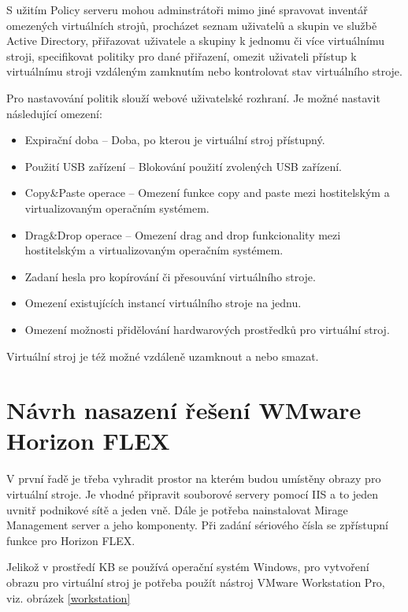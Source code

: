 S užitím Policy serveru mohou adminstrátoři mimo jiné spravovat inventář omezených virtuálních strojů, procházet seznam uživatelů a skupin ve službě Active Directory, přiřazovat uživatele a skupiny k jednomu či více virtuálnímu stroji, specifikovat politiky pro dané přiřazení, omezit uživateli přístup k virtuálnímu stroji vzdáleným zamknutím nebo kontrolovat stav virtuálního stroje.

Pro nastavování politik slouží webové uživatelské rozhraní. Je možné nastavit následující omezení:

\begin{itemize}
    \item Expirační doba -- Doba, po kterou je virtuální stroj přístupný.
    \item Použití USB zařízení -- Blokování použití zvolených USB zařízení.
    \item Copy\&Paste operace -- Omezení funkce copy and paste mezi hostitelským a virtualizovaným operačním systémem.
    \item Drag\&Drop operace -- Omezení drag and drop funkcionality mezi hostitelským a virtualizovaným operačním systémem.
    \item Zadaní hesla pro kopírování či přesouvání virtuálního stroje.
    \item Omezení existujících instancí virtuálního stroje na jednu.
    \item Omezení možnosti přidělování hardwarových prostředků pro virtuální stroj.
\end{itemize}

Virtuální stroj je též možné vzdáleně uzamknout a nebo smazat.

\section{Návrh nasazení řešení WMware Horizon FLEX}

V první řadě je třeba vyhradit prostor na kterém budou umístěny obrazy pro virtuální stroje. Je vhodné připravit souborové servery pomocí IIS a to jeden uvnitř podnikové sítě a jeden vně. Dále je potřeba nainstalovat Mirage Management server a jeho komponenty. Při zadání sériového čísla se zpřístupní funkce pro Horizon FLEX. 

Jelikož v prostředí KB se používá operační systém Windows, pro vytvoření obrazu pro virtuální stroj je potřeba použít nástroj VMware Workstation Pro, viz. obrázek \ref{workstation}

